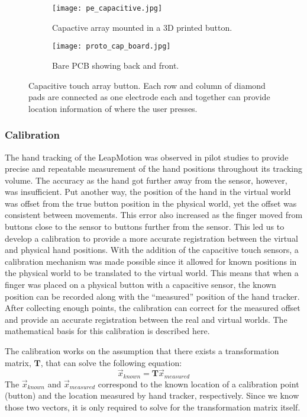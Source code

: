 \begin{figure}
    \begin{subfigure}[t]{0.32\linewidth}
    \centering
    \texttt{[image: pe\_capacitive.jpg]}
    \caption{Capactive array mounted in a 3D printed button.}
    \label{fig:proto_capacitive_array:mounted}
    \end{subfigure}
    \begin{subfigure}[t]{0.64\linewidth}
    \centering
        \texttt{[image: proto\_cap\_board.jpg]}
    \caption{Bare PCB showing back and front.}
    \label{fig:proto_capacitive_array:pcb}
    \end{subfigure}
    \caption{Capacitive touch array button. Each row and column of diamond pads are connected as one electrode each and together can provide location information of where the user presses.}
    \label{fig:proto_capacitive_array}
\end{figure}

\subsubsection{Calibration}

The hand tracking of the LeapMotion was observed in pilot studies to provide precise and repeatable measurement of the hand positions throughout its tracking volume.
The accuracy as the hand got further away from the sensor, however, was insufficient.
Put another way, the position of the hand in the virtual world was offset from the true button position in the physical world, yet the offset was consistent between movements.
This error also increased as the finger moved from buttons close to the sensor to buttons further from the sensor.
This led us to develop a calibration to provide a more accurate registration between the virtual and physical hand positions.
With the addition of the capacitive touch sensors, a calibration mechanism was made possible since it allowed for known positions in the physical world to be translated to the virtual world.
This means that when a finger was placed on a physical button with a capacitive sensor, the known position can be recorded along with the ``measured'' position of the hand tracker.
After collecting enough points, the calibration can correct for the measured offset and provide an accurate registration between the real and virtual worlds.
The mathematical basis for this calibration is described here.

The calibration works on the assumption that there exists a transformation matrix, $\mathbf{T}$, that can solve the following equation:
\begin{equation}
    \vec{x}_{known} = \mathbf{T}\vec{x}_{measured}
    \label{eq:proto_Tvec}
\end{equation}
The $\vec{x}_{known}$ and $\vec{x}_{measured}$ correspond to the known location of a calibration point (button) and the location measured by hand tracker, respectively.
Since we know those two vectors, it is only required to solve for the transformation matrix itself.

